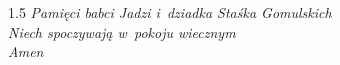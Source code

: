 
\cleardoublepage
\thispagestyle{empty}
\vspace*{0.3\textheight}

{  
    \centering
    \begin{spacing}{1.5}
        \Large{\emph{Pamięci babci Jadzi i~dziadka Staśka Gomulskich \\ 
        Niech spoczywają w~pokoju wiecznym \\ Amen ~\CrossOpenShadow}}
    \end{spacing}
    \par
    \vfill
}